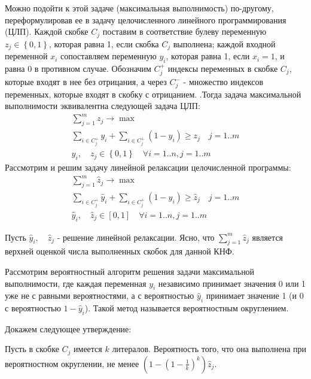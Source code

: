 \begin{problem}
\noindent Можно подойти к этой задаче (максимальная выполнимость) по-другому, переформулировав ее в задачу целочисленного линейного программирования (ЦЛП). Каждой скобке $C_{j} $ поставим в соответствие булеву переменную $z_{j} \in \left\{0,1\right\}$, которая равна 1, если скобка $C_{j} $ выполнена; каждой входной переменной $x_{i} $ сопоставляем переменную $y_{i} $, которая равна 1, если $x_{i} =1$, и равна 0 в противном случае. Обозначим $C_{j}^{+} $ индексы переменных в скобке $C_{j} $, которые входят в нее без отрицания, а через $C_{j}^{-} $ - множество индексов переменных, которые входят в скобку с отрицанием. .Тогда задача максимальной выполнимости эквивалентна следующей задача ЦЛП:
\[\begin{array}{l} {\sum _{j=1}^{m}z_{j}  \to \max } \\ {\sum _{i\in C_{j}^{+} }y_{i} +\sum _{i\in C_{j}^{+} }(1-y_{i} )  \ge z_{j} \quad j=1..m} \\ {y_{i} ,\quad z_{j} \in \left\{0,1\right\}\quad \forall i=1..n,j=1..m} \end{array}\] 
Рассмотрим и решим задачу линейной релаксации целочисленной программы:
\[\begin{array}{l} {\sum _{j=1}^{m}\hat{z}_{j}  \to \max } \\ {\sum _{i\in C_{j}^{+} }\hat{y}_{i} +\sum _{i\in C_{j}^{+} }(1-\hat{y}_{i} )  \ge \hat{z}_{j} \quad j=1..m} \\ {\hat{y}_{i} ,\quad \hat{z}_{j} \in \left[0,1\right]\quad \forall i=1..n,j=1..m} \end{array}\] 


\noindent Пусть $\hat{y}_{i} ,\quad \hat{z}_{j} $ - решение  линейной релаксации. Ясно, что $\sum _{j=1}^{m}\hat{z}_{j}  $ является верхней оценкой числа выполненных скобок для данной КНФ.

\noindent Рассмотрим вероятностный алгоритм решения задачи максимальной выполнимости, где каждая переменная $y_{i} $ независимо принимает значения 0 или 1 уже не с равными вероятностями, а с вероятностью $\hat{y}_{i} $ принимает значение 1 (и 0 с вероятностью $1-\hat{y}_{i} $). Такой метод называется вероятностным округлением.

\noindent 

\noindent Докажем следующее утверждение:

\noindent Пусть в скобке $C_{j} $ имеется $k$ литералов. Вероятность того, что она выполнена при вероятностном округлении, не менее $\left(1-\left(1-\frac{1}{k} \right)^{k} \right)\hat{z}_{j} $.


\end{problem}

